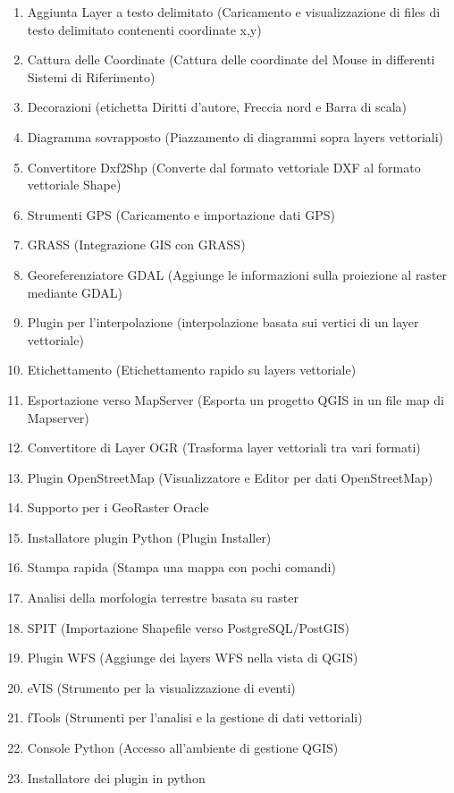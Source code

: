 \begin{enumerate}
\item Aggiunta Layer a testo delimitato (Caricamento e visualizzazione di files di testo delimitato contenenti coordinate x,y)
\item Cattura delle Coordinate (Cattura delle coordinate del Mouse in differenti Sistemi di Riferimento)
\item Decorazioni (etichetta Diritti d’autore, Freccia nord e Barra di scala)
\item Diagramma sovrapposto (Piazzamento di diagrammi sopra layers vettoriali)
\item Convertitore Dxf2Shp (Converte dal formato vettoriale DXF al formato vettoriale Shape)
\item Strumenti GPS (Caricamento e importazione dati GPS)
\item GRASS (Integrazione GIS con GRASS)
\item Georeferenziatore GDAL (Aggiunge le informazioni sulla proiezione al raster mediante GDAL)
\item Plugin per l'interpolazione (interpolazione basata sui vertici di un layer vettoriale)
\item Etichettamento (Etichettamento rapido su layers vettoriale)
\item Esportazione verso MapServer (Esporta un progetto QGIS in un file map di Mapserver)
\item Convertitore di Layer OGR (Trasforma layer vettoriali tra vari formati)
\item Plugin OpenStreetMap (Visualizzatore e Editor per dati OpenStreetMap)
\item Supporto per i GeoRaster Oracle
\item Installatore plugin Python (Plugin Installer)
\item Stampa rapida (Stampa una mappa con pochi comandi)
\item Analisi della morfologia terrestre basata su raster
\item SPIT (Importazione Shapefile verso PostgreSQL/PostGIS)
\item Plugin WFS (Aggiunge dei layers WFS nella vista di QGIS)
\item eVIS (Strumento per la visualizzazione di eventi)
\item fTools (Strumenti per l'analisi e la gestione di dati vettoriali)
\item Console Python (Accesso all'ambiente di gestione QGIS)
\item Installatore dei plugin in python
\end{enumerate}

